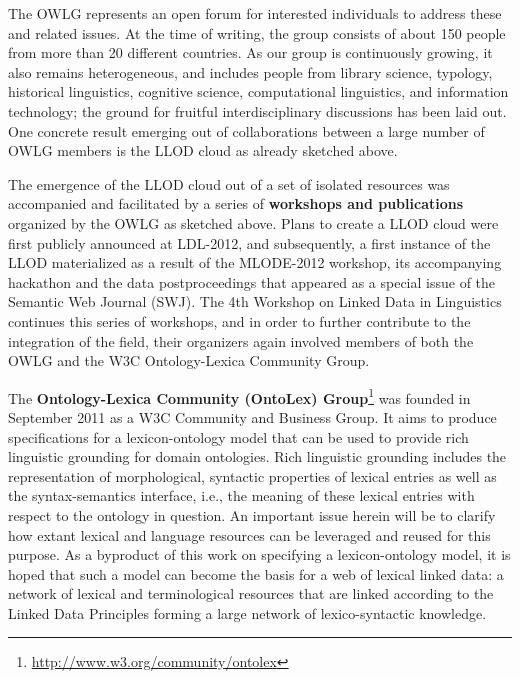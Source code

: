 The OWLG represents an open forum for interested individuals to address these and related issues.
At the time of writing, the group consists of about 150 	%
people from more than 20 									%
different countries.
As our group is continuously growing, it also remains heterogeneous, and includes people from library science, typology, historical linguistics, cognitive science, computational linguistics, and information technology; the ground for fruitful interdisciplinary discussions has been laid out.
One concrete result emerging out of collaborations between a large number of OWLG members is the LLOD cloud as already sketched above.

The emergence of the LLOD cloud out of a set of isolated resources was accompanied and facilitated by a series of \textbf{workshops and publications} organized by the OWLG as sketched above. 
Plans to create a LLOD cloud were first publicly announced at LDL-2012, and subsequently, a first instance of the LLOD materialized as a result of the MLODE-2012 workshop, its accompanying hackathon and the data postproceedings that appeared as a special issue of the Semantic Web Journal (SWJ). 
The 4th Workshop on Linked Data in Linguistics continues this series of workshops, and in order to further contribute to the integration of the field, their organizers again involved members of both the OWLG and the W3C Ontology-Lexica Community Group.

The \textbf{Ontology-Lexica Community (OntoLex) Group}\footnote{\url{http://www.w3.org/community/ontolex}} was founded  in September 2011 as a W3C Community and Business Group. It aims to produce specifications for a lexicon-ontology model that can be used to provide rich linguistic grounding for domain ontologies.
Rich linguistic grounding includes the representation of morphological, syntactic properties of lexical entries as well as the syntax-semantics interface, i.e., the meaning of these lexical entries with respect to the ontology in question. An important issue herein will be to clarify how extant lexical and language resources can be leveraged and reused for this purpose. As a byproduct of this work on specifying a lexicon-ontology model, it is hoped that such a model can become the basis for a web of lexical linked data: a network of lexical and terminological resources that are linked according to the Linked Data Principles forming a large network of lexico-syntactic knowledge.

